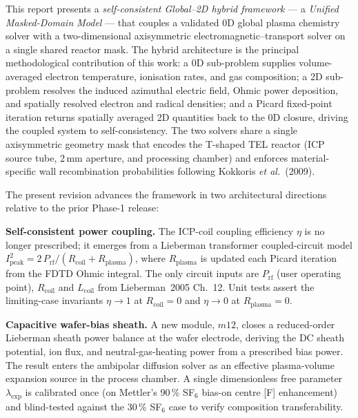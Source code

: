
This report presents a \emph{self-consistent Global--2D hybrid framework} ---
a \emph{Unified Masked-Domain Model} --- that couples a validated 0D global
plasma chemistry solver with a two-dimensional axisymmetric
electromagnetic--transport solver on a single shared reactor mask.  The
hybrid architecture is the principal methodological contribution of this
work: a 0D sub-problem supplies volume-averaged electron temperature,
ionisation rates, and gas composition; a 2D sub-problem resolves the induced
azimuthal electric field, Ohmic power deposition, and spatially resolved
electron and radical densities; and a Picard fixed-point iteration returns
spatially averaged 2D quantities back to the 0D closure, driving the coupled
system to self-consistency.  The two solvers share a single axisymmetric
geometry mask that encodes the T-shaped TEL reactor (ICP source tube, 2\,mm
aperture, and processing chamber) and enforces material-specific wall
recombination probabilities following Kokkoris \textit{et al.}\ (2009).

The present revision advances the framework in two architectural directions
relative to the prior Phase-1 release:

\textbf{Self-consistent power coupling.}  The ICP-coil coupling efficiency
$\eta$ is no longer prescribed; it emerges from a Lieberman transformer
coupled-circuit model
$I_\mathrm{peak}^2 = 2\,P_\mathrm{rf}/(R_\mathrm{coil} + R_\mathrm{plasma})$,
where $R_\mathrm{plasma}$ is updated each Picard iteration from the FDTD
Ohmic integral.  The only circuit inputs are $P_\mathrm{rf}$ (user
operating point), $R_\mathrm{coil}$ and $L_\mathrm{coil}$ from
Lieberman~2005 Ch.~12.  Unit tests assert the limiting-case invariants
$\eta \to 1$ at $R_\mathrm{coil}=0$ and $\eta \to 0$ at
$R_\mathrm{plasma}=0$.

\textbf{Capacitive wafer-bias sheath.}  A new module, $m12$, closes a
reduced-order Lieberman sheath power balance at the wafer electrode,
deriving the DC sheath potential, ion flux, and neutral-gas-heating power
from a prescribed bias power.  The result enters the ambipolar diffusion
solver as an effective plasma-volume expansion source in the process
chamber.  A single dimensionless free parameter $\lambda_\mathrm{exp}$ is
calibrated once (on Mettler's 90\,\% SF$_6$ bias-on centre [F]
enhancement) and blind-tested against the 30\,\% SF$_6$ case to verify
composition transferability.

